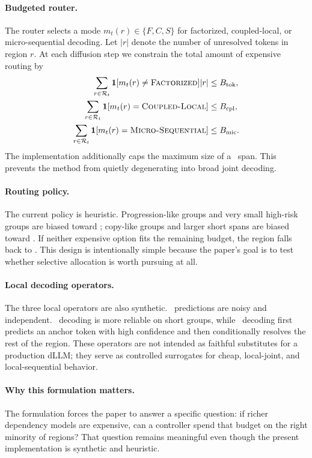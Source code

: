 \paragraph{Budgeted router.}
The router selects a mode $m_t(r) \in \{F,C,S\}$ for factorized, coupled-local, or micro-sequential decoding. Let $|r|$ denote the number of unresolved tokens in region $r$. At each diffusion step we constrain the total amount of expensive routing by
\begin{align}
\sum_{r \in \mathcal{R}_t} \mathbf{1}[m_t(r) \neq \textsc{Factorized}] |r| &\leq B_{\mathrm{tok}}, \\
\sum_{r \in \mathcal{R}_t} \mathbf{1}[m_t(r) = \textsc{Coupled-Local}] &\leq B_{\mathrm{cpl}}, \\
\sum_{r \in \mathcal{R}_t} \mathbf{1}[m_t(r) = \textsc{Micro-Sequential}] &\leq B_{\mathrm{mic}}.
\end{align}
The implementation additionally caps the maximum size of a \coupled\ span. This prevents the method from quietly degenerating into broad joint decoding.

\paragraph{Routing policy.}
The current policy is heuristic. Progression-like groups and very small high-risk groups are biased toward \micro; copy-like groups and larger short spans are biased toward \coupled. If neither expensive option fits the remaining budget, the region falls back to \factorized. This design is intentionally simple because the paper's goal is to test whether selective allocation is worth pursuing at all.

\paragraph{Local decoding operators.}
The three local operators are also synthetic. \factorized\ predictions are noisy and independent. \coupled\ decoding is more reliable on short groups, while \micro\ decoding first predicts an anchor token with high confidence and then conditionally resolves the rest of the region. These operators are not intended as faithful substitutes for a production dLLM; they serve as controlled surrogates for cheap, local-joint, and local-sequential behavior.

\paragraph{Why this formulation matters.}
The formulation forces the paper to answer a specific question: if richer dependency models are expensive, can a controller spend that budget on the right minority of regions? That question remains meaningful even though the present implementation is synthetic and heuristic.
